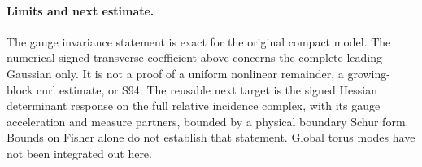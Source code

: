 \documentclass[11pt]{article}
\begin{document}
\paragraph{Limits and next estimate.}
The gauge invariance statement is exact for the original compact model.
The numerical signed transverse coefficient above concerns the complete
leading Gaussian only. It is not a proof of a uniform nonlinear remainder,
a growing-block curl estimate, or S94. The reusable next target is the
signed Hessian determinant response on the full relative incidence
complex, with its gauge acceleration and measure partners, bounded by
a physical boundary Schur form. Bounds on Fisher alone do not establish
that statement. Global torus modes have not been integrated out here.
\end{document}
